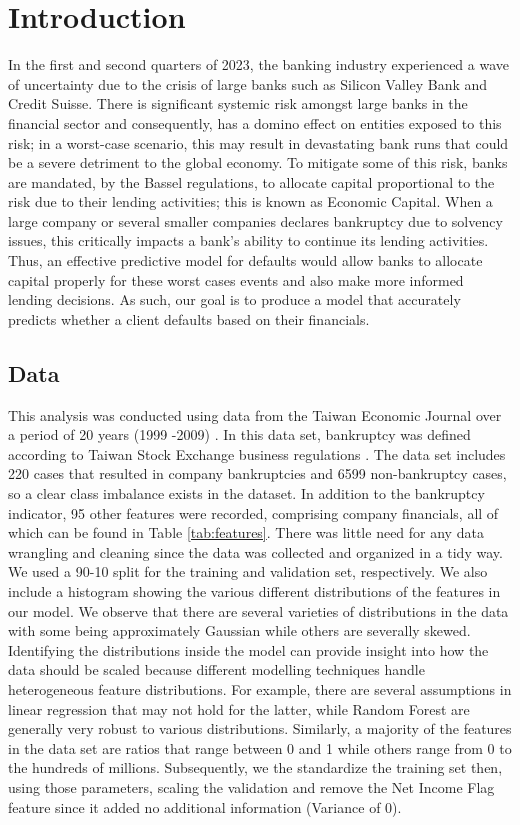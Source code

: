 \documentclass[12pt]{report}
\begin{document}
\chapter{Introduction}
In the first and second quarters of 2023, the banking industry experienced a wave of uncertainty due to the crisis of large banks such as Silicon Valley Bank and Credit Suisse. There is significant systemic risk amongst large banks in the financial sector and consequently, has a domino effect on entities exposed to this risk; in a worst-case scenario, this may result in devastating bank runs that could be a severe detriment to the global economy. To mitigate some of this risk, banks are mandated, by the Bassel regulations, to allocate capital proportional to the risk due to their lending activities; this is known as Economic Capital.  When a large company or several smaller companies declares bankruptcy due to solvency issues, this critically impacts a bank's ability to continue its lending activities. Thus, an effective predictive model for defaults would allow banks to allocate capital properly for these worst cases events and also make more informed lending decisions. As such, our goal is to produce a model that accurately predicts whether a client defaults based on their financials.   

\section{Data}
This analysis was conducted using data from the Taiwan Economic Journal over a period of 20 years (1999 -2009) \cite{Data}. In this data set, bankruptcy was defined according to Taiwan Stock Exchange business regulations \cite{TSE}. The data set includes 220 cases that resulted in company bankruptcies and 6599 non-bankruptcy cases, so a clear class imbalance exists in the dataset. In addition to the bankruptcy indicator, 95 other features were recorded, comprising company financials, all of which can be found in Table \ref{tab:features}. There was little need for any data wrangling and cleaning since the data was collected and organized in a tidy way.  We used a 90-10 split for the training and validation set, respectively. We also include a histogram showing the various different distributions of the features in our model. We observe that there are several varieties of distributions in the data with some being approximately Gaussian while others are severally skewed. Identifying the distributions inside the model can provide insight into how the data should be scaled because different modelling techniques handle heterogeneous feature distributions. For example, there are several assumptions in linear regression that may not hold for the latter, while Random Forest are generally very robust to various distributions. Similarly, a majority of the features in the data set are ratios that range between 0 and 1 while others range from 0 to the hundreds of millions. Subsequently, we the standardize the training set then, using those parameters, scaling the validation and remove the Net Income Flag feature since it added no additional information (Variance of 0).
\end{document}
